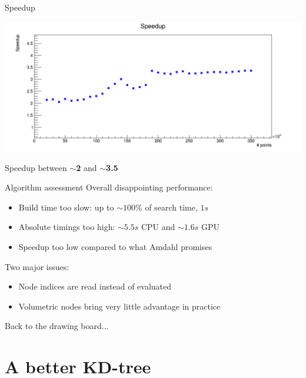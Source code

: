\documentclass{beamer}
\newenvironment{changemargin}[2]{%
  \begin{list}{}{%
    \setlength{\topsep}{0pt}%
    \setlength{\leftmargin}{#1}%
    \setlength{\rightmargin}{#2}%
    \setlength{\listparindent}{\parindent}%
    \setlength{\itemindent}{\parindent}%
    \setlength{\parsep}{\parskip}%
  }%
  \item[]}{\end{list}}
\begin{document}
\begin{frame}{Speedup}
\begin{center}
\begin{changemargin}{-5mm}{-5mm}
\includegraphics[scale=0.28]{images/volumeKdSpeedup.png}\\
\end{changemargin}
\vspace{5mm}
Speedup between \textbf{$\sim$2} and \textbf{$\sim$3.5}
\end{center}
\end{frame}

\begin{frame}{Algorithm assessment}
Overall disappointing performance:
\begin{itemize}
\item Build time too slow: up to $\sim 100\%$ of search time, \textbf{$1\unit{s}$}
\vspace{3mm}
\item Absolute timings too high: $\sim 5.5\unit{s}$ CPU and $\sim 1.6\unit{s}$ GPU
\vspace{3mm}
\item Speedup too low compared to what Amdahl promises
\end{itemize}
\vspace{5mm}
Two major issues:
\begin{itemize}
\item Node indices are read instead of evaluated
\vspace{3mm}
\item Volumetric nodes bring very little advantage in practice
\end{itemize}
\vspace{10mm}
\begin{small}
Back to the drawing board...
\end{small}
\end{frame}

\section{A better KD-tree}
\end{document}
